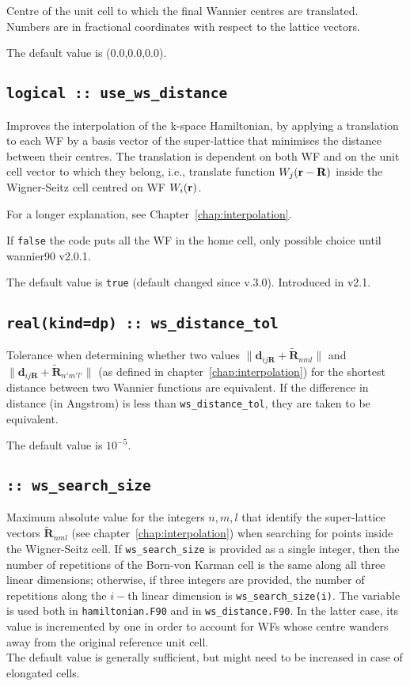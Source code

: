 Centre of the unit cell to which the final Wannier centres are
translated. Numbers are in fractional coordinates with respect to the
lattice vectors.

The default value is (0.0,0.0,0.0).

\subsection[use\_ws\_distance]{\tt logical :: use\_ws\_distance}

Improves the interpolation of the k-space Hamiltonian, by
applying a translation to each WF by a basis
vector of the super-lattice that minimises the distance between their centres.
The translation is dependent on both WF and on the unit cell vector
to which they belong, i.e., translate function $W_j({\bf r}-{\bf R})$ inside
the Wigner-Seitz cell centred on WF $W_i({\bf r})$.

For a longer explanation, see Chapter~\ref{chap:interpolation}.

If {\tt false} the code puts all the WF in the home cell, only possible choice until wannier90 v2.0.1.

The default value is {\tt true} (default changed since v.3.0). Introduced in v2.1.

\subsection[ws\_distance\_tol]{\tt real(kind=dp) :: ws\_distance\_tol}

Tolerance when determining whether two values $\|\mathbf{d}_{ij\mathbf{R}} + \tilde{\mathbf{R}}_{nml} \|$ and $\|\mathbf{d}_{ij\mathbf{R}} + \tilde{\mathbf{R}}_{n'm'l'} \|$ (as defined in chapter~\ref{chap:interpolation}) for the shortest distance between two Wannier functions are equivalent. If the difference in distance (in Angstrom) is less than \texttt{ws\_distance\_tol}, they are taken to be equivalent.

The default value is $10^{-5}$.

\subsection[ws\_search\_size]{\tt :: ws\_search\_size}
Maximum absolute value for the integers $n,m,l$ that identify the super-lattice vectors $\tilde{\mathbf{R}}_{nml}$ (see chapter~\ref{chap:interpolation})
when searching for points inside the Wigner-Seitz cell. 
If \verb#ws_search_size# is provided as a single integer,
then the number of repetitions of the Born-von Karman cell is the same 
along all three linear dimensions; otherwise, if three integers are
provided, the number of repetitions along the $i-$th linear dimension is \verb#ws_search_size(i)#. 
The variable is used both in \verb#hamiltonian.F90# and in \verb#ws_distance.F90#. In the latter case, its value is incremented by one in order to account for WFs whose centre wanders away from the original reference unit cell.\\
The default value is generally sufficient, but might need to be increased in case of elongated cells.

